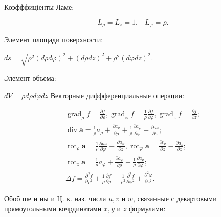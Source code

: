\documentclass[10pt]{article}
\begin{document}
Коэфффиціенты Ламе:



\[

L_{\rho}=L_{z}=1 . \quad L_{\varphi}=\rho .

\]



Элемент площади поверхности:



$d s=\sqrt{\rho^{2}(d \rho d \varphi)^{2}+(d \rho d z)^{2}+\rho^{2}(d \varphi d z)^{2}}$.



Элемент объема:



$d V=\rho d \rho d \varphi d z$ Векторные диффференциальные операции:



\[

\begin{gathered}

\operatorname{grad}_{\rho} f=\frac{\partial f}{\partial \rho}, \operatorname{grad}_{\varphi} f=\frac{1}{\rho} \frac{\partial f}{\partial \varphi}, \operatorname{grad}_{z} f=\frac{\partial f}{\partial z} ; \\

\operatorname{div} \boldsymbol{a}=\frac{1}{\rho} a_{\rho}+\frac{\partial a_{\rho}}{\partial \rho}+\frac{1}{\rho} \frac{\partial a_{\varphi}}{\partial \varphi}+\frac{\partial a z}{\partial z} ; \\

\operatorname{rot}_{\rho} \boldsymbol{a}=\frac{1}{\rho} \frac{\partial a z}{\partial \varphi}-\frac{\partial a_{\varphi}}{\partial z}, \operatorname{rot}_{\varphi} \boldsymbol{a}=\frac{\partial t_{\rho}}{\partial z}-\frac{\partial a_{z}}{\partial z} ; \\

\operatorname{rot}_{z} \boldsymbol{a}=\frac{1}{\rho} a_{\varphi}+\frac{\partial a_{\varphi}}{\partial \rho}-\frac{1}{\rho} \frac{\partial a_{\rho}}{\partial \varphi} ; \\

\Delta f=\frac{\partial^{2} f}{\partial \rho^{2}}+\frac{1}{\rho} \frac{\partial f}{\partial \rho}+\frac{1}{\rho^{2}} \frac{\partial^{2} f}{\partial \varphi^{2}}+\frac{\partial^{2} \varphi}{\partial z^{2}} .

\end{gathered}

\]



Обоб ше н ны и Ц. к. наз. числа $u, v$ и $w$, связанные с декартовыми прямоугольными кочрдинатами $x, y$ и $z$ формулами:
\end{document}
